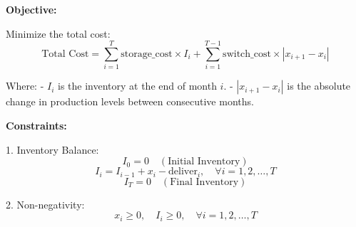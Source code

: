 \documentclass{article}
\begin{document}
\textbf{Objective:}

Minimize the total cost:
\[
\text{Total Cost} = \sum_{i=1}^{T} \text{storage\_cost} \times I_i + \sum_{i=1}^{T-1} \text{switch\_cost} \times |x_{i+1} - x_i|
\]

Where:
- \( I_i \) is the inventory at the end of month \( i \).
- \( |x_{i+1} - x_i| \) is the absolute change in production levels between consecutive months.

\textbf{Constraints:}

1. Inventory Balance:
\[
I_0 = 0 \quad (\text{Initial Inventory})
\]
\[
I_i = I_{i-1} + x_i - \text{deliver}_i, \quad \forall i = 1, 2, \ldots, T
\]
\[
I_T = 0 \quad (\text{Final Inventory})
\]

2. Non-negativity:
\[
x_i \geq 0, \quad I_i \geq 0, \quad \forall i = 1, 2, \ldots, T
\]
\end{document}
